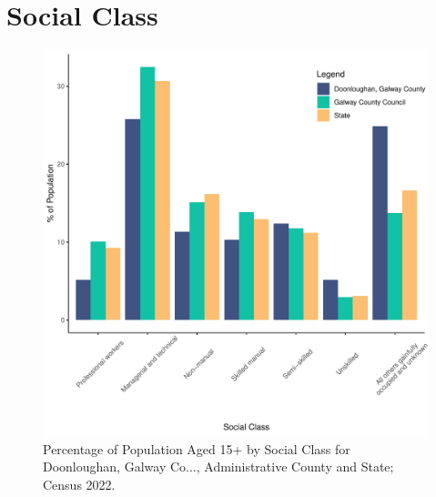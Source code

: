 \documentclass{article}
\begin{document}
\section{Social Class}\label{sect:SC}
\begin{figure}[H]
	\centering
	\includegraphics[width = 140mm]{../figures/SocialClassED.pdf}
	\caption{Percentage of Population Aged 15+ by Social Class for Doonloughan, Galway Co..., Administrative County and State; Census 2022.}
	\label{fig:vbnv}
	\end{figure}
\end{document}
